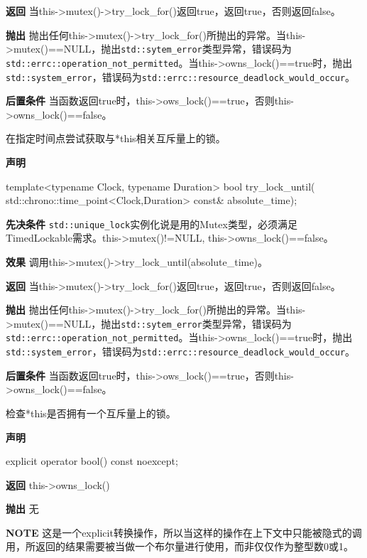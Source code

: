 \textbf{返回}
当this->mutex()->try\_lock\_for()返回true，返回true，否则返回false。

\textbf{抛出}
抛出任何this->mutex()->try\_lock\_for()所抛出的异常。当this->mutex()==NULL，抛出\texttt{std::sytem\_error}类型异常，错误码为\texttt{std::errc::operation\_not\_permitted}。当this->owns\_lock()==true时，抛出\texttt{std::system\_error}，错误码为\texttt{std::errc::resource\_deadlock\_would\_occur}。

\textbf{后置条件}
当函数返回true时，this->ows\_lock()==true，否则this->owns\_lock()==false。


在指定时间点尝试获取与*this相关互斥量上的锁。

\textbf{声明}

\begin{cpp}
template<typename Clock, typename Duration>
bool try_lock_until(
    std::chrono::time_point<Clock,Duration> const& absolute_time);
\end{cpp}

\textbf{先决条件}
\texttt{std::unique\_lock}实例化说是用的Mutex类型，必须满足TimedLockable需求。this->mutex()!=NULL, this->owns\_lock()==false。

\textbf{效果}
调用this->mutex()->try\_lock\_until(absolute\_time)。

\textbf{返回}
当this->mutex()->try\_lock\_for()返回true，返回true，否则返回false。

\textbf{抛出}
抛出任何this->mutex()->try\_lock\_for()所抛出的异常。当this->mutex()==NULL，抛出\texttt{std::sytem\_error}类型异常，错误码为\texttt{std::errc::operation\_not\_permitted}。当this->owns\_lock()==true时，抛出\texttt{std::system\_error}，错误码为\texttt{std::errc::resource\_deadlock\_would\_occur}。

\textbf{后置条件}
当函数返回true时，this->ows\_lock()==true，否则this->owns\_lock()==false。


检查*this是否拥有一个互斥量上的锁。

\textbf{声明}

\begin{cpp}
explicit operator bool() const noexcept;
\end{cpp}

\textbf{返回}
this->owns\_lock()

\textbf{抛出}
无

\textbf{NOTE} 这是一个explicit转换操作，所以当这样的操作在上下文中只能被隐式的调用，所返回的结果需要被当做一个布尔量进行使用，而非仅仅作为整型数0或1。

